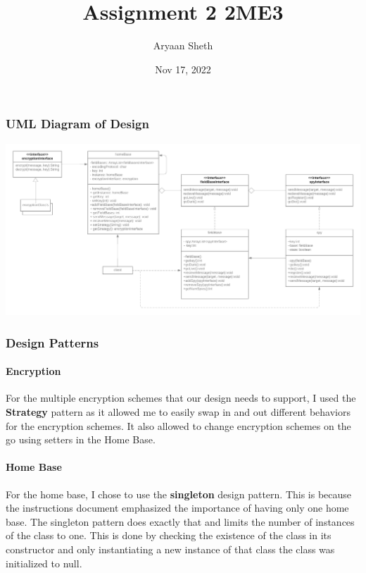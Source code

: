 \documentclass[12pt]{article}
\title{Assignment 2 2ME3}
\author{Aryaan Sheth}
\date{Nov 17, 2022}
\begin{document}
    \maketitle
    \newpage

    \part{}
    \section*{UML Diagram of Design}
        \includegraphics[scale=.25]{part1_uml}

    \section*{Design Patterns}
        \subsection*{Encryption}
            For the multiple encryption schemes that our design needs to support, I used the \textbf{Strategy}
            pattern as it allowed me to easily swap in and out different behaviors for the encryption schemes.
            It also allowed to change encryption schemes on the go using setters in the Home Base. 

        \subsection*{Home Base}
            For the home base, I chose to use the \textbf{singleton} design pattern. This is because
            the instructions document emphasized the importance of having only one home base. The singleton
            pattern does exactly that and limits the number of instances of the class to one. 
            This is done by checking the existence of the class in its constructor and only instantiating a new
            instance of that class the class was initialized to null. 
        
\end{document}
